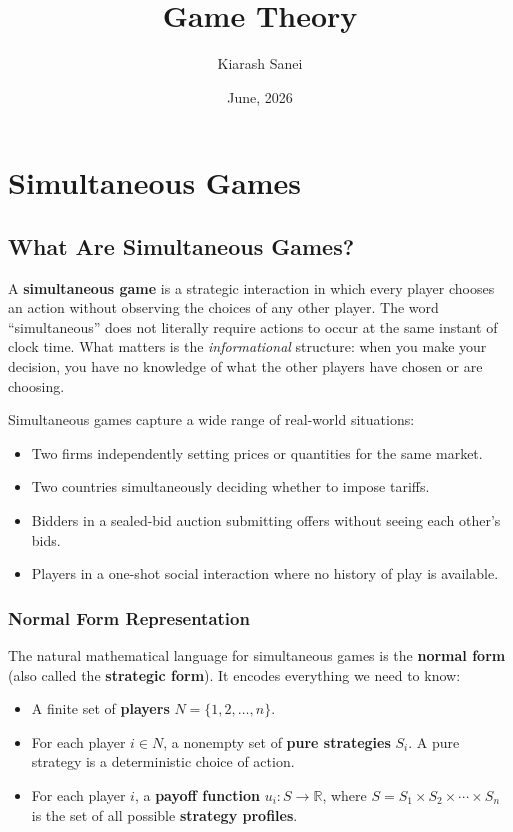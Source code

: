 \documentclass[hidelinks]{article}
\title{\color{carminered}\textbf{Game Theory}}
\author{\color{Thistle}Kiarash Sanei}
\date{\color{SkyBlue}June, 2026}
\begin{document}
\maketitle
\begin{Large}
\tableofcontents
\end{Large}
\newpage

\section{Simultaneous Games}

\subsection{What Are Simultaneous Games?}

A \textbf{simultaneous game} is a strategic interaction in which every player chooses an action without observing the choices of any other player. The word ``simultaneous'' does not literally require actions to occur at the same instant of clock time. What matters is the \textit{informational} structure: when you make your decision, you have no knowledge of what the other players have chosen or are choosing.

Simultaneous games capture a wide range of real-world situations:
\begin{itemize}
    \item Two firms independently setting prices or quantities for the same market.
    \item Two countries simultaneously deciding whether to impose tariffs.
    \item Bidders in a sealed-bid auction submitting offers without seeing each other's bids.
    \item Players in a one-shot social interaction where no history of play is available.
\end{itemize}

\subsubsection{Normal Form Representation}

The natural mathematical language for simultaneous games is the \textbf{normal form} (also called the \textbf{strategic form}). It encodes everything we need to know:

\begin{itemize}
    \item A finite set of \textbf{players} $N = \{1, 2, \ldots, n\}$.
    \item For each player $i \in N$, a nonempty set of \textbf{pure strategies} $S_i$. A pure strategy is a deterministic choice of action.
    \item For each player $i$, a \textbf{payoff function} $u_i : S \to \mathbb{R}$, where $S = S_1 \times S_2 \times \cdots \times S_n$ is the set of all possible \textbf{strategy profiles}.
\end{itemize}
\end{document}
